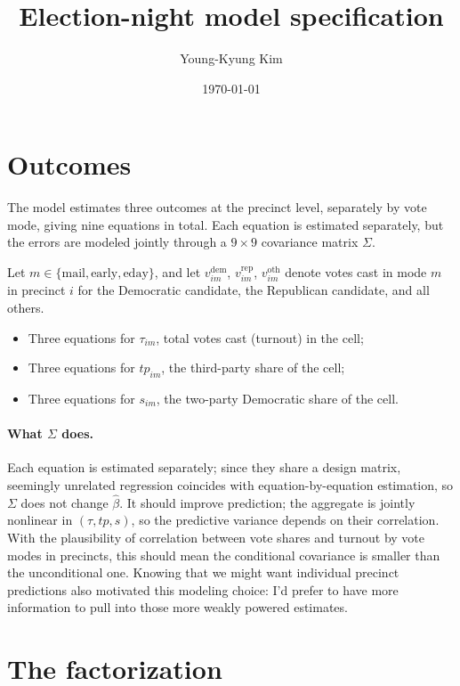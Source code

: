 \documentclass[11pt]{article}
\title{Election-night model specification}
\author{Young-Kyung Kim}
\date{\today}
\newcommand{\dem}{\mathrm{dem}}
\newcommand{\rep}{\mathrm{rep}}
\newcommand{\oth}{\mathrm{oth}}
\begin{document}
\maketitle

\section{Outcomes}

The model estimates three outcomes at the precinct level, separately by vote mode, giving
nine equations in total. Each equation is estimated separately, but the errors are
modeled jointly through a $9 \times 9$ covariance matrix $\Sigma$.

Let $m \in \{\text{mail}, \text{early}, \text{eday}\}$, and let
$v^{\dem}_{im}$, $v^{\rep}_{im}$, $v^{\oth}_{im}$ denote votes cast in mode $m$ in
precinct $i$ for the Democratic candidate, the Republican candidate, and all others.

\begin{itemize}
  \item Three equations for $\tau_{im}$, total votes cast (turnout) in the cell;
  \item Three equations for $tp_{im}$, the third-party share of the cell;
  \item Three equations for $s_{im}$, the two-party Democratic share of the cell.
\end{itemize}

\paragraph{What $\Sigma$ does.}
Each equation is estimated separately; since they share a design matrix, seemingly
unrelated regression coincides with equation-by-equation estimation, so $\Sigma$ does not
change $\hat\beta$. It should improve prediction; the aggregate is jointly nonlinear in $(\tau, tp, s)$, so the predictive variance depends on their correlation. With the plausibility of correlation between vote shares and turnout by vote modes in precincts, this should mean the conditional covariance is smaller
than the unconditional one. Knowing that we might want individual precinct predictions also motivated this modeling choice: I'd prefer to have more information to pull into those more weakly powered estimates. 

\section{The factorization}
\end{document}
